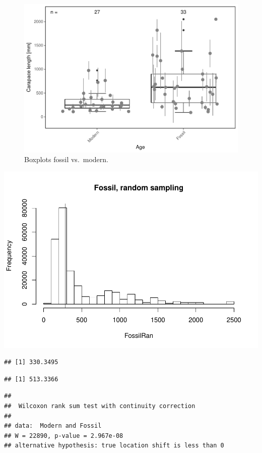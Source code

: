\documentclass[]{article}
\begin{document}
\begin{figure}[htbp]
\centering
\includegraphics{MA_JJ_files/figure-latex/BPMF-1.pdf}
\caption{Boxplots fossil vs.~modern.}
\end{figure}

\includegraphics{MA_JJ_files/figure-latex/RSFM-1.pdf}

\begin{verbatim}
## [1] 330.3495
\end{verbatim}

\begin{verbatim}
## [1] 513.3366
\end{verbatim}

\begin{verbatim}
## 
##  Wilcoxon rank sum test with continuity correction
## 
## data:  Modern and Fossil
## W = 22890, p-value = 2.967e-08
## alternative hypothesis: true location shift is less than 0
\end{verbatim}
\end{document}
